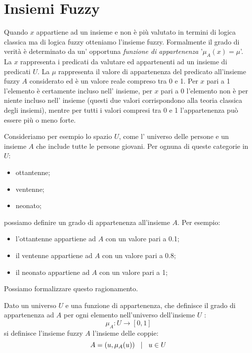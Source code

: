 \documentclass[a4paper,12pt]{report}
\begin{document}
\section{Insiemi Fuzzy}
Quando $x$ appartiene ad un insieme e non è più valutato in termini di logica classica ma di logica fuzzy otteniamo l'insieme fuzzy. 
Formalmente il grado di verità è determinato da un' opportuna \textit{funzione di appartenenza} '$\mu_A(x) = \mu$'. 
La $x$ rappresenta i predicati da valutare ed appartenenti ad un insieme di predicati $U$. La $\mu$ rappresenta il valore di appartenenza del predicato all'insieme fuzzy $A$ considerato ed è un valore reale compreso tra 0 e 1. 
Per $x$ pari a 1 l’elemento è certamente incluso nell’ insieme, per $x$ pari a 0
l’elemento non è per niente incluso nell’ insieme (questi due valori corrispondono alla teoria classica degli insiemi), mentre per tutti i valori compresi tra 0 e 1 l’appartenenza può essere più o meno forte.

\bigskip

Consideriamo per esempio lo spazio $U$, come l' universo delle persone e un insieme $A$ che include tutte le persone giovani. Per ognuna di queste categorie in $U$:
\begin{itemize}
    \item ottantenne;
    \item ventenne;
    \item neonato;
\end{itemize}
possiamo definire un grado di appartenenza all'insieme $A$. Per esempio:
\begin{itemize}
    \item l'ottantenne appartiene ad $A$ con un valore pari a 0.1;
    \item il ventenne appartiene ad $A$ con un valore pari a 0.8;
    \item il neonato appartiene ad $A$ con un valore pari a 1;
\end{itemize}
Possiamo formalizzare questo ragionamento. 

Dato un universo $U$ e una funzione di appartenenza, che definisce il grado di appartenenza ad $A$ per ogni elemento nell'universo dell'insieme $U$ :
\begin{equation*}
    \mu_A : U \to [0,1]
\end{equation*}
si definisce l'insieme fuzzy $A$ l'insieme delle coppie:
\begin{equation*}
    A = {(u, \mu_A(u)) \hspace{0,3cm} | \hspace{0,3cm} u\in U}
\end{equation*}
\end{document}
